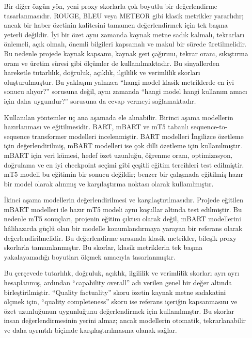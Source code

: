Bir diğer özgün yön, yeni proxy skorlarla çok boyutlu bir değerlendirme tasarlanmasıdır. ROUGE, BLEU veya METEOR gibi klasik metrikler yararlıdır; ancak bir haber özetinin kalitesini tamamen değerlendirmek için tek başına yeterli değildir. İyi bir özet aynı zamanda kaynak metne sadık kalmalı, tekrarları önlemeli, açık olmalı, önemli bilgileri kapsamalı ve makul bir sürede üretilmelidir. Bu nedenle projede kaynak kapsamı, kaynak geri çağırımı, tekrar oranı, sıkıştırma oranı ve üretim süresi gibi ölçümler de kullanılmaktadır. Bu sinyallerden hareketle tutarlılık, doğruluk, açıklık, ilgililik ve verimlilik skorları oluşturulmuştur. Bu yaklaşım yalnızca “hangi model klasik metriklerde en iyi sonucu alıyor?” sorusuna değil, aynı zamanda “hangi model hangi kullanım amacı için daha uygundur?” sorusuna da cevap vermeyi sağlamaktadır.

Kullanılan yöntemler üç ana aşamada ele alınabilir. Birinci aşama modellerin hazırlanması ve eğitilmesidir. BART, mBART ve mT5 tabanlı sequence-to-sequence transformer modelleri incelenmiştir. BART modelleri İngilizce özetleme için değerlendirilmiş, mBART modelleri ise çok dilli özetleme için kullanılmıştır. mBART için veri kümesi, hedef özet uzunluğu, öğrenme oranı, optimizasyon, doğrulama ve en iyi checkpoint seçimi gibi çeşitli eğitim tercihleri test edilmiştir. mT5 modeli bu eğitimin bir sonucu değildir; benzer bir çalışmada eğitilmiş hazır bir model olarak alınmış ve karşılaştırma noktası olarak kullanılmıştır.

İkinci aşama modellerin değerlendirilmesi ve karşılaştırılmasıdır. Projede eğitilen mBART modelleri ile hazır mT5 modeli aynı koşullar altında test edilmiştir. Bu nedenle mT5 sonuçları, projenin eğitim çıktısı olarak değil, mBART modellerini hâlihazırda güçlü olan bir modelle konumlandırmaya yarayan bir referans olarak değerlendirilmelidir. Bu değerlendirme sırasında klasik metrikler, bileşik proxy skorlarla tamamlanmıştır. Bu skorlar, klasik metriklerin tek başına yakalayamadığı boyutları ölçmek amacıyla tasarlanmıştır.

Bu çerçevede tutarlılık, doğruluk, açıklık, ilgililik ve verimlilik skorları ayrı ayrı hesaplanmış, ardından “capability overall” adı verilen genel bir değer altında birleştirilmiştir. “Quality factuality” skoru özetin kaynak metne sadakatini ölçmek için, “quality completeness” skoru ise referans içeriğin kapsanmasını ve özet uzunluğunun uygunluğunu değerlendirmek için kullanılmıştır. Bu skorlar insan değerlendirmesinin yerini almaz; ancak modellerin otomatik, tekrarlanabilir ve daha ayrıntılı biçimde karşılaştırılmasına olanak sağlar.

